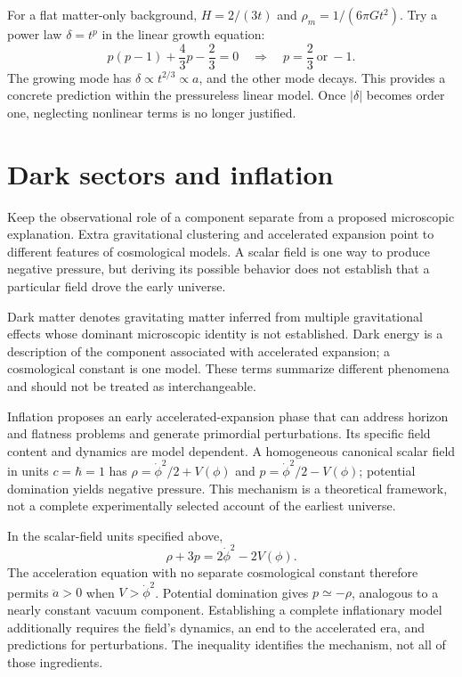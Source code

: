\documentclass[11pt,oneside]{book}
\theoremstyle{reviewstyle}
\begin{document}
For a flat matter-only background, $H=2/(3t)$ and $\rho_m=1/(6\pi Gt^2)$. Try a power law $\delta=t^p$ in the linear growth equation:
\begin{equation}
p(p-1)+\frac43p-\frac23=0
\quad\Longrightarrow\quad p=\frac23\ \text{or}\ -1.
\end{equation}
The growing mode has $\delta\propto t^{2/3}\propto a$, and the other mode decays. This provides a concrete prediction within the pressureless linear model. Once $|\delta|$ becomes order one, neglecting nonlinear terms is no longer justified.

\section{Dark sectors and inflation}
Keep the observational role of a component separate from a proposed microscopic explanation. Extra gravitational clustering and accelerated expansion point to different features of cosmological models. A scalar field is one way to produce negative pressure, but deriving its possible behavior does not establish that a particular field drove the early universe.

Dark matter denotes gravitating matter inferred from multiple gravitational effects whose dominant microscopic identity is not established. Dark energy is a description of the component associated with accelerated expansion; a cosmological constant is one model. These terms summarize different phenomena and should not be treated as interchangeable.

Inflation proposes an early accelerated-expansion phase that can address horizon and flatness problems and generate primordial perturbations. Its specific field content and dynamics are model dependent. A homogeneous canonical scalar field in units $c=\hbar=1$ has $\rho=\dot\phi^2/2+V(\phi)$ and $p=\dot\phi^2/2-V(\phi)$; potential domination yields negative pressure. This mechanism is a theoretical framework, not a complete experimentally selected account of the earliest universe.

In the scalar-field units specified above,
\begin{equation}
\rho+3p=2\dot\phi^2-2V(\phi).
\end{equation}
The acceleration equation with no separate cosmological constant therefore permits $\ddot a>0$ when $V>\dot\phi^2$. Potential domination gives $p\simeq-\rho$, analogous to a nearly constant vacuum component. Establishing a complete inflationary model additionally requires the field's dynamics, an end to the accelerated era, and predictions for perturbations. The inequality identifies the mechanism, not all of those ingredients.
\end{document}
